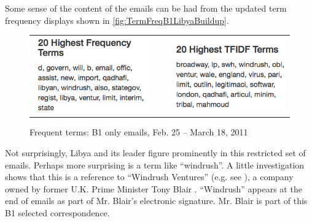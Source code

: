 \documentclass[journal]{vgtc}                %
\begin{document}
Some sense of the content of the emails can be had from the updated term frequency displays shown in \autoref{fig:TermFreqB1LibyaBuildup}.
\begin{figure}[h]
\begin{center}
\begin{tabular}{ccc}
\includegraphics[width=0.4\linewidth]{TFIDFB1LibyaBuildup} &
$~~~~$ &
\includegraphics[width=0.4\linewidth]{TermFreqB1LibyaBuildup} 
\end{tabular}
\caption{Frequent terms: B1 only emails, Feb. 25 -- March 18, 2011}
\label{fig:TermFreqB1LibyaBuildup}
\end{center}
\end{figure}
Not surprisingly,  Libya and its leader figure prominently in this restricted set of emails.  
Perhaps more surprising is a term like ``windrush''.  A little investigation shows that this is a reference to ``Windrush Ventures'' (e.g. see  \cite{windrushTelegraph, windrushGuardian}),  a company owned by former U.K. Prime Minister Tony Blair .  ``Windrush'' appears at the end of emails as part of Mr. Blair's electronic signature.   
Mr. Blair is part of this B1 selected correspondence.
\end{document}
